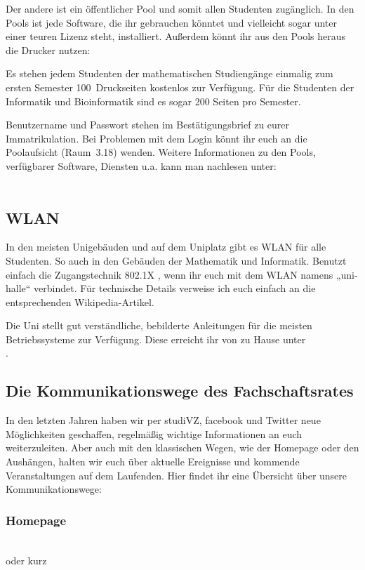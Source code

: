 Der andere ist ein öffentlicher Pool und somit allen Studenten zugänglich.
In den Pools ist jede Software, die ihr gebrauchen könntet und vielleicht sogar unter einer teuren Lizenz steht, installiert.
Außerdem könnt ihr aus den Pools heraus die Drucker nutzen:

Es stehen jedem Studenten der mathematischen Studiengänge einmalig zum ersten Semester 100~Druckseiten kostenlos zur Verfügung.
Für die Studenten der Informatik und Bioinformatik sind es sogar 200 Seiten pro Semester.

Benutzername und Passwort stehen im Bestätigungsbrief zu eurer Immatrikulation.
Bei Problemen mit dem Login könnt ihr euch an die Poolaufsicht (Raum~3.18) wenden.
Weitere Informationen zu den Pools, verfügbarer Software, Diensten u.a. kann man nachlesen unter:\\[1.0em]
\\ 

\subsection{WLAN}

In den meisten Unigebäuden und auf dem Uniplatz gibt es WLAN für alle Studenten.
So auch in den Gebäuden der Mathematik und Informatik.
Benutzt einfach die Zugangstechnik 802.1X , wenn ihr euch mit dem WLAN namens „uni-halle“ verbindet.
Für technische Details verweise ich euch einfach an die entsprechenden Wikipedia-Artikel.

Die Uni stellt gut verständliche, bebilderte Anleitungen für die meisten Betriebssysteme zur Verfügung.
Diese erreicht ihr von zu Hause unter\\
    .


\subsection[Kommunikationswege des FSR]{Die Kommunikationswege des Fachschaftsrates}
In den letzten Jahren haben wir per studiVZ, facebook und Twitter neue Mög\-lich\-kei\-ten geschaffen, regelmäßig wichtige Informationen an euch
weiterzuleiten.
Aber auch mit den klassischen Wegen, wie der Homepage oder den Aushängen, halten wir euch über aktuelle Ereignisse und kommende Veranstaltungen
auf dem Laufenden.
Hier findet ihr eine Übersicht über unsere Kommunikationswege:

\subsubsection{Homepage}
     \\
    oder kurz 

